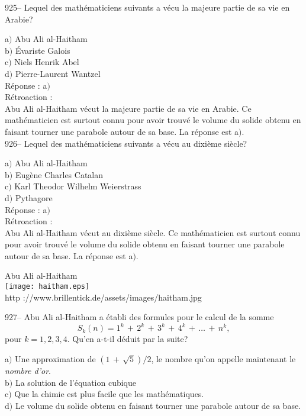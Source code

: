 ﻿\documentclass[letterpaper, 12pt]{article}
\begin{document}
925-- Lequel des math\'ematiciens suivants a v\'ecu la majeure
partie de sa vie en Arabie?

a$)$ Abu Ali al-Haitham \\
b$)$ \'Evariste Galois \\
c$)$ Niels Henrik Abel \\
d$)$ Pierre-Laurent Wantzel \\

R\'eponse : a$)$\\

R\'etroaction : \\
Abu Ali al-Haitham v\'ecut la majeure partie de sa vie en Arabie. Ce
math\'ematicien est surtout connu pour avoir trouv\'e le volume du
solide obtenu en faisant tourner une parabole
autour de sa base. La r\'eponse est a$)$.\\

926-- Lequel des math\'ematiciens suivants a v\'ecu au dixi\`eme
si\`ecle?

a$)$ Abu Ali al-Haitham \\
b$)$ Eug\`ene Charles Catalan \\
c$)$ Karl Theodor Wilhelm Weierstrass \\
d$)$ Pythagore\\

R\'eponse : a$)$\\

R\'etroaction : \\
Abu Ali al-Haitham v\'ecut au dixi\`eme si\`ecle. Ce math\'ematicien
est surtout connu pour avoir trouv\'e le volume du solide obtenu en
faisant tourner une parabole
autour de sa base. La r\'eponse est a$)$.\\

        \begin{center}
        Abu Ali al-Haitham\\
    \texttt{[image: haitham.eps]}\\
        {\footnotesize http ://www.brillentick.de/assets/images/haitham.jpg}
    \end{center}

927-- Abu Ali al-Haitham a \'etabli des formules pour le calcul de la somme
$$S_k(n) =1^k\,+\,2^k\,+\,3^k\,+\,4^k\,+\,\ldots\,+\,n^k,$$
pour $k=1,2,3,4$. Qu'en a-t-il d\'eduit par la suite?

a$)$ Une approximation de $(1\,+\,\sqrt5)/2$, le nombre qu'on appelle
maintenant le {\sl nombre d'or}. \\
b$)$ La solution de l'\'equation cubique \\
c$)$ Que la chimie est plus facile que les math\'ematiques. \\
d$)$ Le volume du solide obtenu en faisant tourner une parabole autour de sa
base.\\
\end{document}
